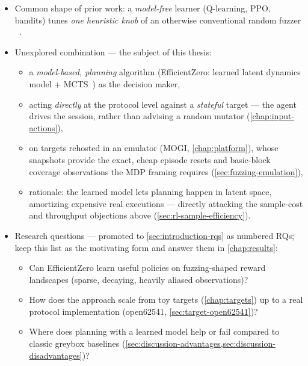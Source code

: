 \begin{itemize}
  \item Common shape of prior work: a \emph{model-free} learner (Q-learning, PPO, bandits) tunes
    \emph{one heuristic knob} of an otherwise conventional random fuzzer
    ~\cite{bottinger_deep_2018,binosi_rainfuzz_2023,wang_reinforcement_2021,wang_syzvegas_2021,christakis_banditfuzz_2020}.
  \item Unexplored combination --- the subject of this thesis:
    \begin{itemize}
      \item a \emph{model-based, planning} algorithm (EfficientZero: learned latent dynamics
        model + MCTS~\cite{ye_mastering_2021,schrittwieser_mastering_2020}) as the decision maker,
      \item acting \emph{directly} at the protocol level against a \emph{stateful} target ---
        the agent drives the session, rather than advising a random mutator
        (\cref{chap:input-actions}),
      \item on targets rehosted in an emulator (MOGI, \cref{chap:platform}), whose snapshots
        provide the exact, cheap episode resets and basic-block coverage observations the MDP
        framing requires (\cref{sec:fuzzing-emulation}),
      \item rationale: the learned model lets planning happen in latent space, amortizing
        expensive real executions --- directly attacking the sample-cost and throughput
        objections above (\cref{sec:rl-sample-efficiency}).
    \end{itemize}
  \item Research questions --- promoted to \cref{sec:introduction-rqs} as numbered RQs; keep this list as the motivating form and answer them in \cref{chap:results}:
    \begin{itemize}
      \item Can EfficientZero learn useful policies on fuzzing-shaped reward landscapes
        (sparse, decaying, heavily aliased observations)?
      \item How does the approach scale from toy targets (\cref{chap:targets}) up to a real
        protocol implementation (open62541, \cref{sec:target-open62541})?
      \item Where does planning with a learned model help or fail compared to classic greybox
        baselines (\cref{sec:discussion-advantages,sec:discussion-disadvantages})?
    \end{itemize}
\end{itemize}
